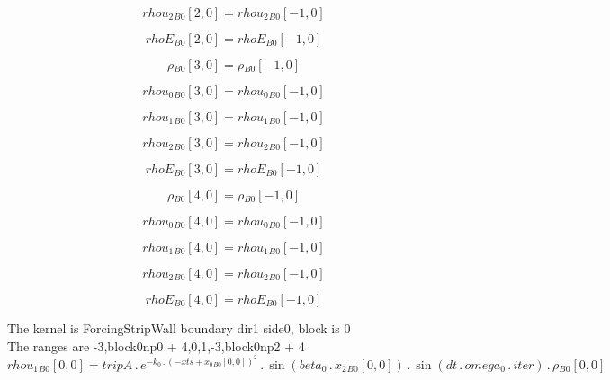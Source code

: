 \documentclass{article}
\begin{document}
\begin{dmath}{rhou_{2}{_{B0}}}[{2,0}] = {rhou_{2}{_{B0}}}[{-1,0}]\end{dmath}

\begin{dmath}{rhoE{_{B0}}}[{2,0}] = {rhoE{_{B0}}}[{-1,0}]\end{dmath}

\begin{dmath}{\rho{_{B0}}}[{3,0}] = {\rho{_{B0}}}[{-1,0}]\end{dmath}

\begin{dmath}{rhou_{0}{_{B0}}}[{3,0}] = {rhou_{0}{_{B0}}}[{-1,0}]\end{dmath}

\begin{dmath}{rhou_{1}{_{B0}}}[{3,0}] = {rhou_{1}{_{B0}}}[{-1,0}]\end{dmath}

\begin{dmath}{rhou_{2}{_{B0}}}[{3,0}] = {rhou_{2}{_{B0}}}[{-1,0}]\end{dmath}

\begin{dmath}{rhoE{_{B0}}}[{3,0}] = {rhoE{_{B0}}}[{-1,0}]\end{dmath}

\begin{dmath}{\rho{_{B0}}}[{4,0}] = {\rho{_{B0}}}[{-1,0}]\end{dmath}

\begin{dmath}{rhou_{0}{_{B0}}}[{4,0}] = {rhou_{0}{_{B0}}}[{-1,0}]\end{dmath}

\begin{dmath}{rhou_{1}{_{B0}}}[{4,0}] = {rhou_{1}{_{B0}}}[{-1,0}]\end{dmath}

\begin{dmath}{rhou_{2}{_{B0}}}[{4,0}] = {rhou_{2}{_{B0}}}[{-1,0}]\end{dmath}

\begin{dmath}{rhoE{_{B0}}}[{4,0}] = {rhoE{_{B0}}}[{-1,0}]\end{dmath}

\noindent The kernel is ForcingStripWall boundary dir1 side0, block is 0\\\noindent The ranges are -3,block0np0 + 4,0,1,-3,block0np2 + 4\\\begin{dmath}{rhou_{1}{_{B0}}}[{0,0}] = tripA \,.\, e^{- k_0 \,.\, \left(- xts + {x_{0}{_{B0}}}[{0,0}] \right)^{2}} \,.\, \sin{\left (beta_0 \,.\, {x_{2}{_{B0}}}[{0,0}] \right )} \,.\, \sin{\left (dt \,.\, omega_0 \,.\, iter \right )} \,.\, 
{\rho{_{B0}}}[{0,0}]\end{dmath}
\end{document}
